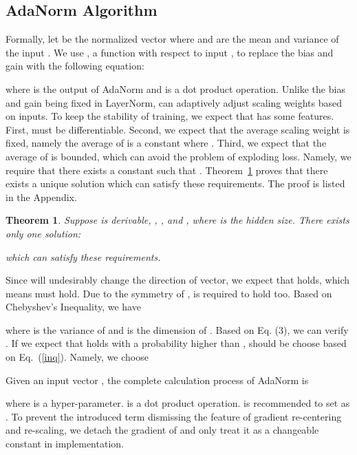 \documentclass{article}
\newtheorem{thm}{Theorem}[]
\begin{document}
 


 
\subsection{AdaNorm Algorithm}
Formally, let    be the normalized vector  where  and  are the mean and variance of the input . We use  , a function with respect to input , to replace the bias and gain with the following equation: 

where  is the output of AdaNorm and  is a dot product operation. Unlike the bias and gain being fixed in LayerNorm,  can adaptively adjust  scaling weights based on  inputs. To keep the stability of training, we expect that  has some features. First,  must be differentiable. Second, we expect that the average scaling weight is fixed, namely the average of  is a constant  where . Third, we expect that the average of  is bounded, which can avoid the problem of exploding loss. Namely, we require that there exists a constant  such that . Theorem~\ref{thm21} proves that there exists a unique solution which can satisfy these requirements. The proof is listed in 
the Appendix.
\begin{thm}
\label{thm21}
Suppose  is derivable, ,  , and  , where  is the hidden size. There exists only one solution:
\begin{center}
   
\end{center}
which can satisfy these requirements.
\end{thm}
Since   will undesirably change the direction of vector, we expect that  holds, which means  must hold. Due to the symmetry of ,  is required to hold too. Based on Chebyshev's Inequality, we have 

where  is the variance of  and  is the dimension of .
Based on Eq. (3), we can verify . If we expect that  holds with a probability higher than ,  should be choose based on Eq.~(\ref{inq}). Namely, we choose

Given an input vector , the complete calculation process of AdaNorm is

where  is a hyper-parameter.  is a dot product operation.   is recommended to set as .  To prevent the introduced term  dismissing the feature of gradient re-centering and re-scaling,  we detach the gradient of    and only treat it as a changeable constant in implementation. 
\end{document}
